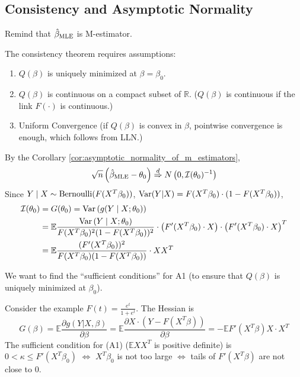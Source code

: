 \documentclass[11pt]{elegantbook}
\begin{document}
\subsection{Consistency and Asymptotic Normality}
Remind that $\hat{\beta}_\textnormal{MLE}$ is M-estimator.
\begin{assumption}
    The consistency theorem requires assumptions:
    \begin{enumerate}[({A}1).]
        \item $Q(\beta)$ is uniquely minimized at $\beta=\beta_0$.
        \item $Q(\beta)$ is continuous on a compact subset of $\mathbb{R}$. ($Q(\beta)$ is continuous if the link $F(\cdot)$ is continuous.)
        \item Uniform Convergence (if $Q(\beta)$ is convex in $\beta$, pointwise convergence is enough, which follows from LLN.)
    \end{enumerate}
\end{assumption}

By the Corollary \ref{cor:asymptotic_normality_of_m_estimators}, $$\sqrt{n}\left(\hat{\beta}_\textnormal{MLE}-\theta_0\right) \stackrel{d}{\Rightarrow} N\left(0,\mathcal{I}(\theta_0)^{-1}\right)$$
Since $Y\mid X\sim \textnormal{Bernoulli}(F(X^T\beta_0))$, $\textnormal{Var}(Y|X)=F(X^T\beta_0)\cdot(1-F(X^T\beta_0))$,
\begin{equation}
    \begin{aligned}
        \mathcal{I}(\theta_0)&=G(\theta_0)=\textnormal{Var}\left(g(Y\mid X;\theta_0)\right)\\
        &=\mathbb{E}\frac{\textnormal{Var}\left(Y\mid X;\theta_0\right)}{F(X^T\beta_0)^2(1-F(X^T\beta_0))^2}\cdot\left(F'(X^T\beta_0)\cdot X\right)\cdot\left(F'(X^T\beta_0)\cdot X\right)^T\\
        &=\mathbb{E}\frac{(F'(X^T\beta_0))^2}{F(X^T\beta_0)(1-F(X^T\beta_0))}\cdot X X^T
    \end{aligned}
    \nonumber
\end{equation}


We want to find the ``sufficient conditions'' for A1 (to ensure that $Q(\beta)$ is uniquely minimized at $\beta_0$).
\begin{example}
    Consider the example $F(t)=\frac{e^t}{1+e^t}$. The Hessian is $$G(\beta)=\mathbb{E}\frac{\partial g(Y|X,\beta)}{\partial \beta}=\mathbb{E}\frac{\partial X\cdot (Y-F(X^T\beta))}{\partial \beta}=-\mathbb{E}F'(X^T\beta)X\cdot X^T$$
    The sufficient condition for (A1) ($\mathbb{E}XX^T$ is positive definite) is $0<\kappa\leq F'(X^T\beta_0)$ $\Leftrightarrow$ $X^T\beta_0$ is not too large $\Leftrightarrow$ tails of $F'(X^T\beta)$ are not close to $0$.
\end{example}
\end{document}
